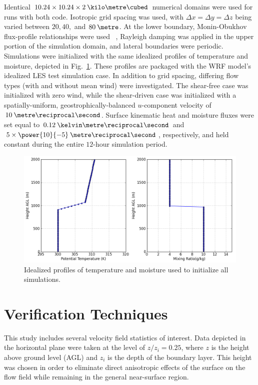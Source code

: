 Identical $10.24 \times 10.24 \times 2 \: \kilo\metre\cubed$ numerical domains were used for runs with both code. Isotropic grid spacing was used, with $\Delta x = \Delta y = \Delta z$ being varied between $20, 40,$ and $80\: \metre$. At the lower boundary, Monin-Obukhov flux-profile relationships were used ~\citep{MO, Dyer}, Rayleigh damping was applied in the upper portion of the simulation domain, and lateral boundaries were periodic. Simulations were initialized with the same idealized profiles of temperature and moisture, depicted in Fig.~\ref{figure501}. These profiles are packaged with the WRF model's idealized LES test simulation case. In addition to grid spacing, differing flow types (with and without mean wind) were investigated. The shear-free case was initialized with zero wind, while the shear-driven case was initialized with a spatially-uniform, geostrophically-balanced $u$-component velocity of $10 \: \metre\reciprocal\second$. Surface kinematic heat and moisture fluxes were set equal to  $0.12 \: \kelvin \metre\reciprocal\second$ and $5\times \power{10}{-5} \: \metre\reciprocal\second$, respectively, and held constant during the entire $12\mbox{-}$hour simulation period.


\begin{figure}[H]
\begin{center}
\includegraphics[width=\textwidth]{figures/chapter5/ideal_input_soundings}
\end{center}
\caption{Idealized profiles of temperature and moisture used to initialize all simulations.}
\label{figure501}
\end{figure}


\section{Verification Techniques}
\label{vt-52}

This study includes several velocity field statistics of interest. Data depicted in the horizontal plane were taken at the level of $z / z_i = 0.25$, where $z$ is the height above ground level (AGL) and $z_i$ is the depth of the boundary layer. This height was chosen in order to eliminate direct anisotropic effects of the surface on the flow field while remaining in the general near-surface region. 


